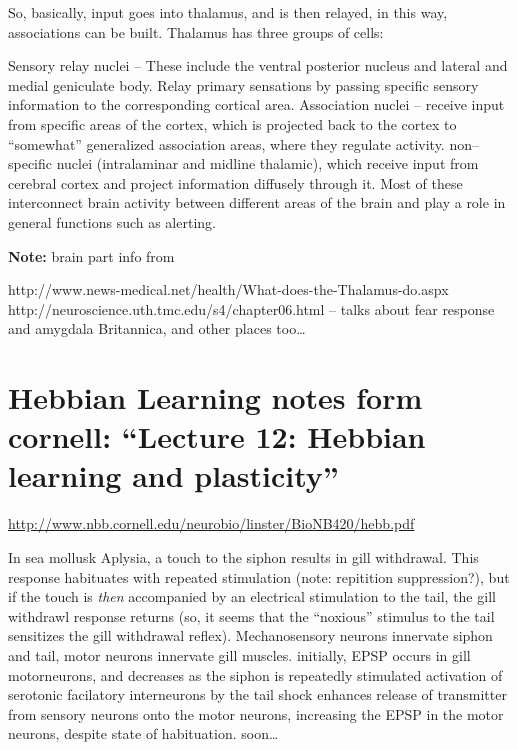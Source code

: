 \documentclass[11pt, a4paper, oneside]{article}   	%
\begin{document}
So, basically, input goes into thalamus, and is then relayed, in this way, associations can be built. Thalamus has three groups of cells:
\begin{outline}
\point Sensory relay nuclei -- These include the ventral posterior nucleus and lateral and medial geniculate body. Relay primary sensations by passing specific sensory information to the corresponding cortical area. 
\point Association nuclei -- receive input from specific areas of the cortex, which is projected back to the cortex to ``somewhat'' generalized association areas, where they regulate activity.
\point non--specific nuclei (intralaminar and midline thalamic), which receive input from cerebral cortex and project information diffusely through it. Most of these interconnect brain activity between different areas of the brain and play a role in general functions such as alerting.
\end{outline}

\textbf{Note:} brain part info from

\begin{outline}
    \point http://www.news-medical.net/health/What-does-the-Thalamus-do.aspx
    \point http://neuroscience.uth.tmc.edu/s4/chapter06.html -- talks about fear response and amygdala
    \point Britannica, and other places too\ldots
\end{outline}

\section{Hebbian Learning notes form cornell: ``Lecture 12: Hebbian learning and plasticity''}

\url{http://www.nbb.cornell.edu/neurobio/linster/BioNB420/hebb.pdf}


\begin{outline}
    \point In sea mollusk Aplysia, a touch to the siphon results in gill withdrawal. This response habituates with repeated stimulation (note: repitition suppression?), but if the touch is \textit{then} accompanied by an electrical stimulation to the tail, the gill withdrawl response returns (so, it seems that the ``noxious'' stimulus to the tail sensitizes the gill withdrawal reflex).
    \point Mechanosensory neurons innervate siphon and tail, motor neurons innervate gill muscles.
        \subpoint initially, EPSP occurs in gill motorneurons, and decreases as the siphon is repeatedly stimulated
        \subpoint activation of serotonic facilatory interneurons by the tail shock enhances release of transmitter from sensory neurons onto the motor neurons, increasing the EPSP in the motor neurons, despite state of habituation. 
    \point soon\ldots

\end{outline}
\end{document}

